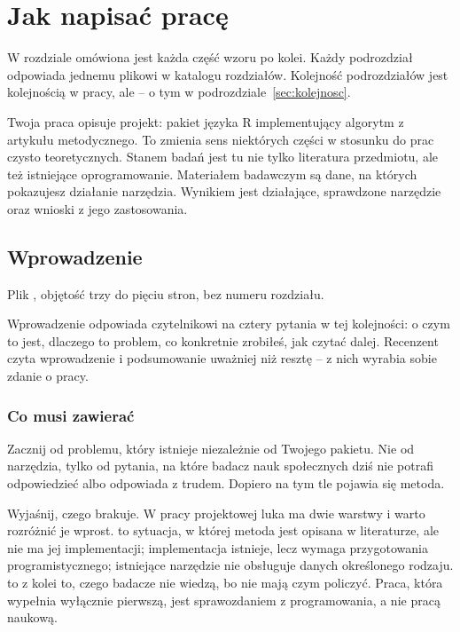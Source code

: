 \chapter{Jak napisać pracę}\label{ch:jakpisac}

W rozdziale omówiona jest każda część wzoru po kolei. Każdy podrozdział odpowiada jednemu plikowi w katalogu rozdziałów. Kolejność podrozdziałów jest kolejnością w pracy, ale  -- o tym w podrozdziale~\ref{sec:kolejnosc}.

Twoja praca opisuje projekt: pakiet języka R implementujący algorytm z artykułu metodycznego. To zmienia sens niektórych części w stosunku do prac czysto teoretycznych. Stanem badań jest tu nie tylko literatura przedmiotu, ale też istniejące oprogramowanie. Materiałem badawczym są dane, na których pokazujesz działanie narzędzia. Wynikiem jest działające, sprawdzone narzędzie oraz wnioski z jego zastosowania.

\section{Wprowadzenie}

Plik , objętość trzy do pięciu stron, bez numeru rozdziału.

Wprowadzenie odpowiada czytelnikowi na cztery pytania w tej kolejności: o czym to jest, dlaczego to problem, co konkretnie zrobiłeś, jak czytać dalej. Recenzent czyta wprowadzenie i podsumowanie uważniej niż resztę -- z nich wyrabia sobie zdanie o pracy.

\subsection{Co musi zawierać}

 Zacznij od problemu, który istnieje niezależnie od Twojego pakietu. Nie od narzędzia, tylko od pytania, na które badacz nauk społecznych dziś nie potrafi odpowiedzieć albo odpowiada z trudem. Dopiero na tym tle pojawia się metoda.

 Wyjaśnij, czego brakuje. W pracy projektowej luka ma dwie warstwy i warto rozróżnić je wprost.  to sytuacja, w której metoda jest opisana w literaturze, ale nie ma jej implementacji; implementacja istnieje, lecz wymaga przygotowania programistycznego; istniejące narzędzie nie obsługuje danych określonego rodzaju.  to z kolei to, czego badacze nie wiedzą, bo nie mają czym policzyć. Praca, która wypełnia wyłącznie pierwszą, jest sprawozdaniem z programowania, a nie pracą naukową.

